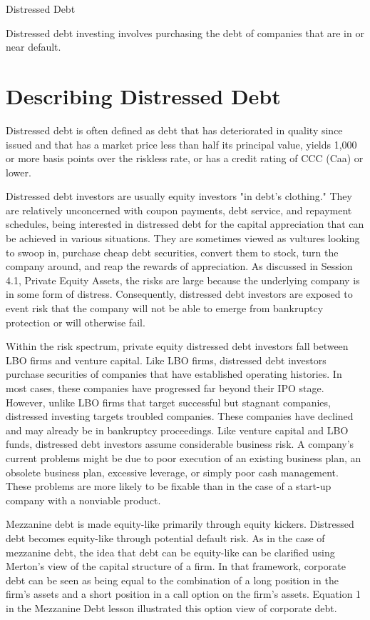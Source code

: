 \documentclass[11pt]{article}
\begin{document}
Distressed Debt

Distressed debt investing involves purchasing the debt of companies that are in or near default.

\section*{Describing Distressed Debt}
Distressed debt is often defined as debt that has deteriorated in quality since issued and that has a market price less than half its principal value, yields 1,000 or more basis points over the riskless rate, or has a credit rating of CCC (Caa) or lower.

Distressed debt investors are usually equity investors "in debt's clothing." They are relatively unconcerned with coupon payments, debt service, and repayment schedules, being interested in distressed debt for the capital appreciation that can be achieved in various situations. They are sometimes viewed as vultures looking to swoop in, purchase cheap debt securities, convert them to stock, turn the company around, and reap the rewards of appreciation. As discussed in Session 4.1, Private Equity Assets, the risks are large because the underlying company is in some form of distress. Consequently, distressed debt investors are exposed to event risk that the company will not be able to emerge from bankruptcy protection or will otherwise fail.

Within the risk spectrum, private equity distressed debt investors fall between LBO firms and venture capital. Like LBO firms, distressed debt investors purchase securities of companies that have established operating histories. In most cases, these companies have progressed far beyond their IPO stage. However, unlike LBO firms that target successful but stagnant companies, distressed investing targets troubled companies. These companies have declined and may already be in bankruptcy proceedings. Like venture capital and LBO funds, distressed debt investors assume considerable business risk. A company's current problems might be due to poor execution of an existing business plan, an obsolete business plan, excessive leverage, or simply poor cash management. These problems are more likely to be fixable than in the case of a start-up company with a nonviable product.

Mezzanine debt is made equity-like primarily through equity kickers. Distressed debt becomes equity-like through potential default risk. As in the case of mezzanine debt, the idea that debt can be equity-like can be clarified using Merton's view of the capital structure of a firm. In that framework, corporate debt can be seen as being equal to the combination of a long position in the firm's assets and a short position in a call option on the firm's assets. Equation 1 in the Mezzanine Debt lesson illustrated this option view of corporate debt.
\end{document}
